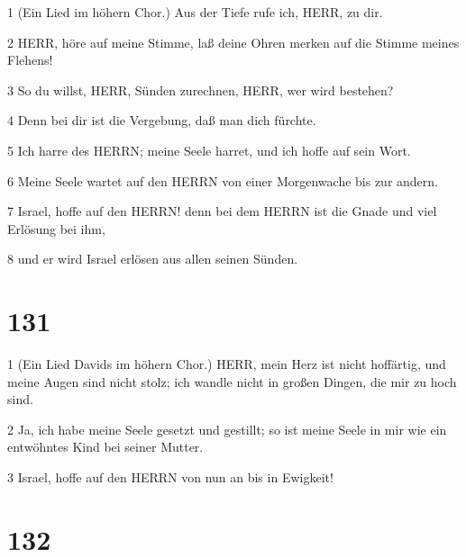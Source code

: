 \par 1 (Ein Lied im höhern Chor.) Aus der Tiefe rufe ich, HERR, zu dir.
\par 2 HERR, höre auf meine Stimme, laß deine Ohren merken auf die Stimme meines Flehens!
\par 3 So du willst, HERR, Sünden zurechnen, HERR, wer wird bestehen?
\par 4 Denn bei dir ist die Vergebung, daß man dich fürchte.
\par 5 Ich harre des HERRN; meine Seele harret, und ich hoffe auf sein Wort.
\par 6 Meine Seele wartet auf den HERRN von einer Morgenwache bis zur andern.
\par 7 Israel, hoffe auf den HERRN! denn bei dem HERRN ist die Gnade und viel Erlösung bei ihm,
\par 8 und er wird Israel erlösen aus allen seinen Sünden.

\chapter{131}

\par 1 (Ein Lied Davids im höhern Chor.) HERR, mein Herz ist nicht hoffärtig, und meine Augen sind nicht stolz; ich wandle nicht in großen Dingen, die mir zu hoch sind.
\par 2 Ja, ich habe meine Seele gesetzt und gestillt; so ist meine Seele in mir wie ein entwöhntes Kind bei seiner Mutter.
\par 3 Israel, hoffe auf den HERRN von nun an bis in Ewigkeit!

\chapter{132}

